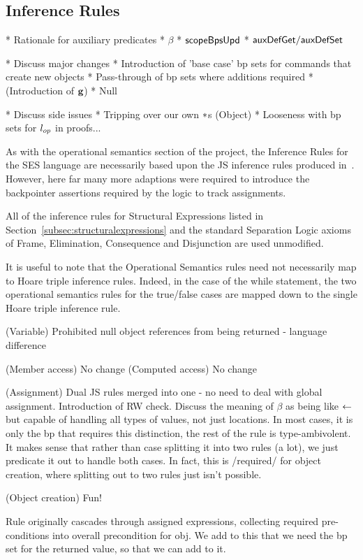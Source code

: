 \documentclass[a4paper,notitlepage]{report}
\begin{document}
\subsection{Inference Rules}
* Rationale for auxiliary predicates
  * $\beta$
  * $\mathsf{scopeBpsUpd}$
  * $\mathsf{auxDefGet}/\mathsf{auxDefSet}$

* Discuss major changes
  * Introduction of 'base case' bp sets for commands that create new objects
  * Pass-through of bp sets where additions required
  * (Introduction of ${\mathrm{\textbf{g}}}$)
  * Null

* Discuss side issues
  * Tripping over our own $\mathbin{*}$s (Object)
  * Looseness with bp sets for $l_{op}$ in proofs...

As with the operational semantics section of the project, the Inference Rules
for the SES language are necessarily based upon the JS inference rules produced
in~\cite{gms-popl}. However, here far many more adaptions were required to introduce
the backpointer assertions required by the logic to track assignments.

All of the inference rules for Structural Expressions listed in
Section~\ref{subsec:structuralexpressions} and the standard Separation Logic
axioms of Frame, Elimination, Consequence and Disjunction are used unmodified.

It is useful to note that the Operational Semantics rules need not necessarily
map to Hoare triple inference rules. Indeed, in the case of the while statement,
the two operational semantics rules for the true/false cases are mapped down to
the single Hoare triple inference rule.

(Variable) Prohibited null object references from being returned - language
difference

(Member access) No change
(Computed access) No change

(Assignment) Dual JS rules merged into one - no need to deal with global
assignment.
Introduction of RW check.
Discuss the meaning of $\beta$ as being like $\leftarrow$ but capable of handling all
types of values, not just locations. In most cases, it is only the bp that
requires this distinction, the rest of the rule is type-ambivolent. It makes
sense that rather than case splitting it into two rules (a lot), we just
predicate it out to handle both cases. In fact, this is /required/ for object
creation, where splitting out to two rules just isn't possible.

(Object creation) Fun!

Rule originally cascades through assigned expressions, collecting required
pre-conditions into overall precondition for obj. We add to this that we need
the bp set for the returned value, so that we can add to it.
\end{document}
